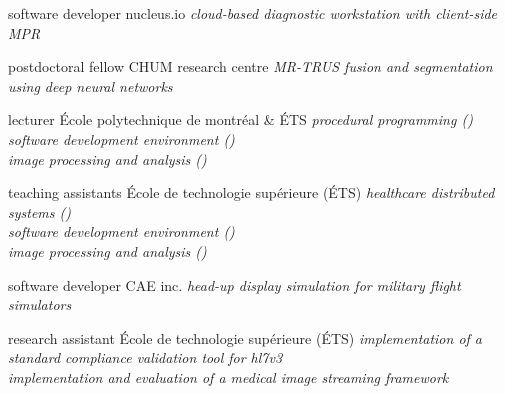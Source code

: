 \documentclass[print]{friggeri-cv}
\begin{document}
\begin{entrylist}
   {software developer} {nucleus.io} {\emph{cloud-based diagnostic workstation with client-side MPR}}

   {postdoctoral fellow} {CHUM research centre} {\emph{MR-TRUS fusion and segmentation using deep neural networks}}


   {lecturer} {École polytechnique de montréal \& {\scriptsize ÉTS}} {\emph{procedural programming (\infmat)\\\emph{software development environment (\eleenv)}\\image processing and analysis (\eletr)}}
  


  
   {teaching assistants} {École de technologie supérieure {\scriptsize (ÉTS)}} {\emph{healthcare distributed systems (\gtssys)\\software development environment (\eleenv)\\image processing and analysis (\eletr)}}
  
   {software developer} {\scriptsize{CAE} inc.} {\emph{head-up display simulation for military flight simulators}}

   {research assistant} {École de technologie supérieure {\scriptsize (ÉTS)}} {\emph{implementation of a standard compliance validation tool for hl{\small7}v{\small3}\\implementation and evaluation of a medical image streaming framework}}
\end{entrylist}
\end{document}

